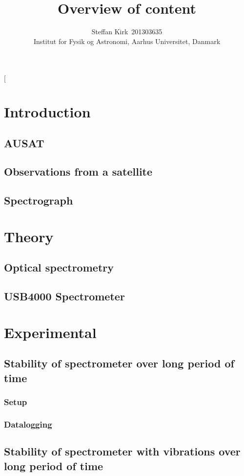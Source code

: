 \documentclass[danish,a4paper,oneside, twocolumn,article,9pt]{memoir}
\title{Overview of content}
\author{
Steffan Kirk~201303635 \\
Institut for Fysik og Astronomi, Aarhus Universitet, Danmark}
\date{}
\begin{document}
\onecolumn[
\maketitle
\chapter{Introduction}
\section{AUSAT}
\section{Observations from a satellite}
\section{Spectrograph}

\chapter{Theory}
\section{Optical spectrometry}
\section{USB4000 Spectrometer}



\chapter{Experimental}
\section{Stability of spectrometer over long period of time}
\subsection{Setup}
\subsection{Datalogging}


\section{Stability of spectrometer with vibrations over long period of time}
\end{document}
